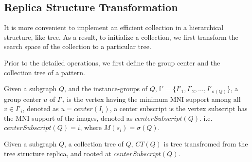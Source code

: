 \subsection{Replica Structure Transformation}
It is more convenient to implement an efficient collection in a hierarchical structure, like tree. As a result, to initialize a collection, we first transform the search space of the collection to a particular tree.
\par Prior to the detailed operations, we first define the group center and the collection tree of a pattern.
\begin{defn}
	Given a subgraph $Q$, and the instance-groups of $Q$, $\mathbb{I'}=\{I'_1,I'_2,\ldots,I'_{\sigma(Q)}\}$, a group center $u$ of $I'_i$ is the vertex having the minimum MNI support among all $v\in I'_i$, denoted as $u=center(I_i)$, a center subscript is the vertex subscript has the MNI support of the images, denoted as $centerSubscript(Q)$. i.e. $centerSubscript(Q)=i$, where $M(s_i)=\sigma(Q)$.
\end{defn}
\begin{defn}
	Given a subgraph $Q$, a collection tree of $Q$, $CT(Q)$ is tree transfromed from the tree structure replica, and rooted at $centerSubscript(Q)$.
\end{defn}

